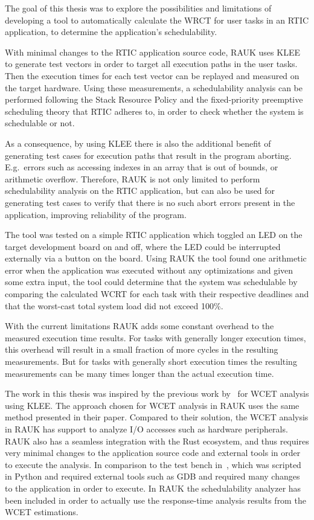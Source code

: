 The goal of this thesis was to explore the possibilities and limitations of
developing a tool to automatically calculate the WRCT for user tasks in an
RTIC application, to determine the application's schedulability.

With minimal changes to the RTIC application source code, RAUK uses KLEE to
generate test vectors in order to target all execution paths in the user tasks.
Then the execution times for each test vector can be replayed and measured on
the target hardware. Using these measurements, a schedulability analysis can be
performed following the Stack Resource Policy and the fixed-priority preemptive
scheduling theory that RTIC adheres to, in order to check whether the system is
schedulable or not.

As a consequence, by using KLEE there is also the additional benefit of
generating test cases for execution paths that result in the program aborting.
E.g.\ errors such as accessing indexes in an array that is out of bounds, or
arithmetic overflow. Therefore, RAUK is not only limited to perform
schedulability analysis on the RTIC application, but can also be used for
generating test cases to verify that there is no such abort errors present in
the application, improving reliability of the program.

The tool was tested on a simple RTIC application which toggled an LED on the
target development board on and off, where the LED could be interrupted
externally via a button on the board. Using RAUK the tool found one arithmetic
error when the application was executed without any optimizations and given
some extra input, the tool could determine that the system was schedulable by
comparing the calculated WCRT for each task with their respective deadlines and
that the worst-cast total system load did not exceed 100\%.

With the current limitations RAUK adds some constant overhead to the measured
execution time results. For tasks with generally longer execution times, this
overhead will result in a small fraction of more cycles in the resulting
measurements. But for tasks with generally short execution times the resulting
measurements can be many times longer than the actual execution time.

The work in this thesis was inspired by the previous work by~\cite{lindner} for
WCET analysis using KLEE\@. The approach chosen for WCET analysis in RAUK uses
the same method presented in their paper. Compared to their solution, the WCET
analysis in RAUK has support to analyze I/O accesses such as hardware
peripherals. RAUK also has a seamless integration with the Rust ecosystem, and
thus requires very minimal changes to the application source code and external
tools in order to execute the analysis. In comparison to the test bench
in~\cite{lindner}, which was scripted in Python and required external tools
such as GDB and required many changes to the application in order to execute.
In RAUK the schedulability analyzer has been included in order to actually use
the response-time analysis results from the WCET estimations.

